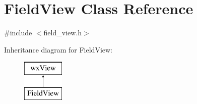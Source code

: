 \hypertarget{a00103}{\section{Field\-View Class Reference}
\label{a00103}
}


{\ttfamily \#include $<$field\-\_\-view.\-h$>$}

Inheritance diagram for Field\-View\-:\begin{figure}[H]
\begin{center}
\leavevmode
\includegraphics[height=2.000000cm]{a00103}
\end{center}
\end{figure}
